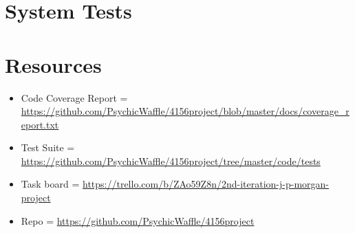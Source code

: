 \documentclass{article}
\begin{document}
\section{System Tests}

\section{Resources}
\begin{itemize}
\item Code Coverage Report = \url{https://github.com/PsychicWaffle/4156project/blob/master/docs/coverage_report.txt}
\item Test Suite = \url{https://github.com/PsychicWaffle/4156project/tree/master/code/tests}
\item Task board = \url{https://trello.com/b/ZAo59Z8n/2nd-iteration-j-p-morgan-project}
\item Repo = \url{https://github.com/PsychicWaffle/4156project}
\end{itemize}
\end{document}
